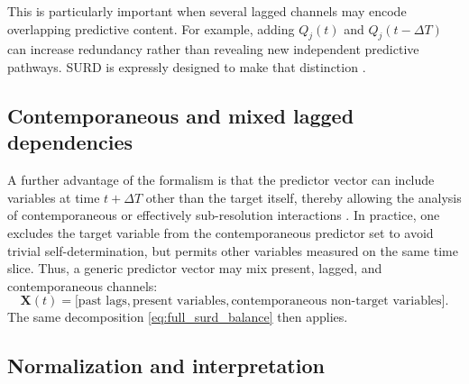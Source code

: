 \documentclass[12pt, a4paper]{article}
\begin{document}
This is particularly important when several lagged channels may encode overlapping predictive content. For example, adding \(Q_j(t)\) and \(Q_j(t-\Delta T)\) can increase redundancy rather than revealing new independent predictive pathways. SURD is expressly designed to make that distinction \cite{MartinezSanchez2024SURD}.

\subsection{Contemporaneous and mixed lagged dependencies}

A further advantage of the formalism is that the predictor vector can include variables at time \(t+\Delta T\) other than the target itself, thereby allowing the analysis of contemporaneous or effectively sub-resolution interactions \cite{MartinezSanchez2024SURD}. In practice, one excludes the target variable from the contemporaneous predictor set to avoid trivial self-determination, but permits other variables measured on the same time slice. Thus, a generic predictor vector may mix present, lagged, and contemporaneous channels:
\begin{equation}
\mathbf{X}(t)=
\bigl[
\text{past lags},
\text{present variables},
\text{contemporaneous non-target variables}
\bigr].
\end{equation}
The same decomposition \eqref{eq:full_surd_balance} then applies.

\subsection{Normalization and interpretation}
\end{document}
